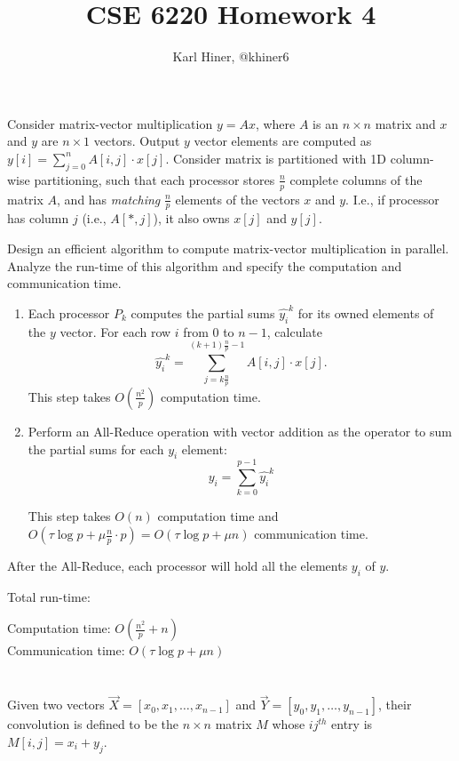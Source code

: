 \documentclass{article}
\begin{document}
\title{CSE 6220 Homework 4}
\author{Karl Hiner, @khiner6}
\date{}
\maketitle

\section{}
Consider matrix-vector multiplication $y = Ax$, where $A$ is an $n \times n$ matrix and $x$ and $y$ are $n \times 1$ vectors.
Output $y$ vector elements are computed as $y[i] = \sum_{j=0}^{n}{A[i,j] \cdot x[j]}$.
Consider matrix is partitioned with 1D column-wise partitioning, such that each processor stores $\frac{n}{p}$ complete columns of the matrix $A$, and has \textit{matching} $\frac{n}{p}$ elements of the vectors $x$ and $y$.
I.e., if processor has column $j$ (i.e., $A[*,j]$), it also owns $x[j]$ and $y[j]$.

Design an efficient algorithm to compute matrix-vector multiplication in parallel.
Analyze the run-time of this algorithm and specify the computation and communication time.

\begin{enumerate}
\item Each processor $P_k$ computes the partial sums $\hat{y_i}^k$ for its owned elements of the $y$ vector.
For each row $i$ from $0$ to $n-1$, calculate
$$\hat{y_i}^k = \sum\limits_{j=k\frac{n}{p}}^{(k+1)\frac{n}{p}-1}{A[i,j] \cdot x[j]}.$$
This step takes $O(\frac{n^2}{p})$ computation time.
\item Perform an All-Reduce operation with vector addition as the operator to sum the partial sums for each $y_i$ element:
$$y_i = \sum\limits_{k = 0}^{p-1}{\hat{y_i}^k}$$

This step takes $O(n)$ computation time and $O(\tau\log{p} + \mu\frac{n}{p} \cdot p) = O(\tau\log{p} + \mu n)$ communication time.
\end{enumerate}

After the All-Reduce, each processor will hold all the elements $y_i$ of $y$.

Total run-time:

Computation time: $O(\frac{n^2}{p} + n)$\\
Communication time: $O(\tau\log{p} + \mu n)$

\section{}
Given two vectors $\vec{X} = [x_0,x_1,\dots,x_{n-1}]$ and $\vec{Y} = [y_0,y_1,\dots,y_{n-1}]$, their convolution is defined to be the $n \times n$ matrix $M$ whose $ij^{th}$ entry is $M[i,j] = x_i + y_j$.
\end{document}
